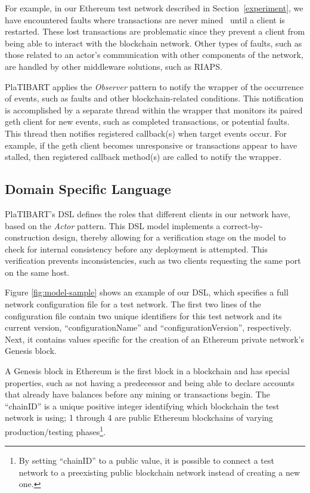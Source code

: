 For example, in our Ethereum test network described in Section~\ref{experiment}, we have encountered faults where transactions are never mined~\cite{EthereumIssue14893:online} until a client is restarted. These lost transactions are problematic since they prevent a client from being able to interact with the blockchain network. Other types of faults, such as those related to an actor's communication with other components of the network, are handled by other middleware solutions, such as RIAPS.

PlaTIBART applies the \textit{Observer} pattern to notify the wrapper of the occurrence of events, such as faults and other blockchain-related conditions. This notification is accomplished by a separate thread within the wrapper that monitors its paired geth client for new events, such as completed transactions, or potential faults. This thread then notifies registered callback(s) when target events occur. For example, if the geth client becomes unresponsive or transactions appear to have stalled, then registered callback method(s) are called to notify the wrapper. 

\subsection{Domain Specific Language}

PlaTIBART's DSL defines the roles that different clients in our network have, based on the \textit{Actor} pattern. This DSL model implements a correct-by-construction design, thereby allowing for a verification stage on the model to check for internal consistency before any deployment is attempted. This verification prevents inconsistencies, such as two clients requesting the same port on the same host. 

Figure \ref{fig:model-sample} shows an example of our DSL, which specifies a full network configuration file for a test network. The first two lines of the configuration file contain two unique identifiers for this test network and its current version, ``configurationName'' and ``configurationVersion'', respectively. Next, it contains values specific for the creation of an Ethereum private network's Genesis block. 

A Genesis block in Ethereum is the first block in a blockchain and has special properties, such as not having a predecessor and being able to declare accounts that already have balances before any mining or transactions begin. The ``chainID'' is a unique positive integer identifying which blockchain the test network is using; 1 through 4 are public Ethereum blockchains of varying production/testing phases\footnote{By setting ``chainID'' to a public value, it is possible to connect a test network to a preexisting public blockchain network instead of creating a new one.}. 

